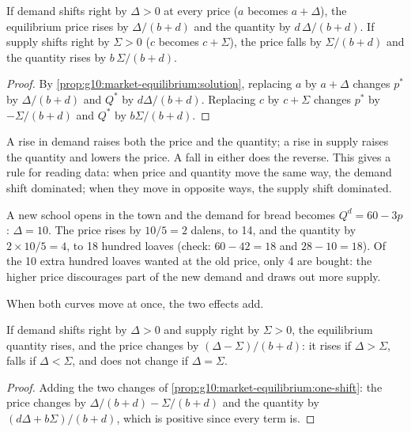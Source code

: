 \begin{proposition}\label{prop:g10:market-equilibrium:one-shift}
If demand shifts right by $\Delta > 0$ at every price ($a$ becomes $a + \Delta$), the equilibrium price rises by $\Delta/(b + d)$ and the
quantity by $d\,\Delta/(b + d)$. If supply shifts right by $\Sigma > 0$ ($c$ becomes $c + \Sigma$), the price falls by $\Sigma/(b + d)$ and
the quantity rises by $b\,\Sigma/(b + d)$.
\end{proposition}
\begin{proof}
By \cref{prop:g10:market-equilibrium:solution}, replacing $a$ by $a + \Delta$ changes $p^*$ by $\Delta/(b + d)$ and $Q^*$ by $d\Delta/(b+d)$.
Replacing $c$ by $c + \Sigma$ changes $p^*$ by $-\Sigma/(b + d)$ and $Q^*$ by $b\Sigma/(b + d)$.
\end{proof}

A rise in demand raises both the price and the quantity; a rise in supply raises the quantity and lowers the price. A fall in either does
the reverse. This gives a rule for reading data: when price and quantity move the same way, the demand shift dominated; when they move in
opposite ways, the supply shift dominated.

\begin{example}\label{ex:g10:market-equilibrium:more-buyers}
A new school opens in the town and the demand for bread becomes $Q^d = 60 - 3p$: $\Delta = 10$. The price rises by $10/5 = 2$ dalens, to 14,
and the quantity by $2 \times 10/5 = 4$, to 18 hundred loaves (check: $60 - 42 = 18$ and $28 - 10 = 18$). Of the 10 extra hundred loaves
wanted at the old price, only 4 are bought: the higher price discourages part of the new demand and draws out more supply.
\end{example}

When both curves move at once, the two effects add.

\begin{proposition}\label{prop:g10:market-equilibrium:two-shifts}
If demand shifts right by $\Delta > 0$ and supply right by $\Sigma > 0$, the equilibrium quantity rises, and the price changes by
$(\Delta - \Sigma)/(b + d)$: it rises if $\Delta > \Sigma$, falls if $\Delta < \Sigma$, and does not change if $\Delta = \Sigma$.
\end{proposition}
\begin{proof}
Adding the two changes of \cref{prop:g10:market-equilibrium:one-shift}: the price changes by $\Delta/(b+d) - \Sigma/(b+d)$ and the quantity
by $(d\Delta + b\Sigma)/(b+d)$, which is positive since every term is.
\end{proof}


